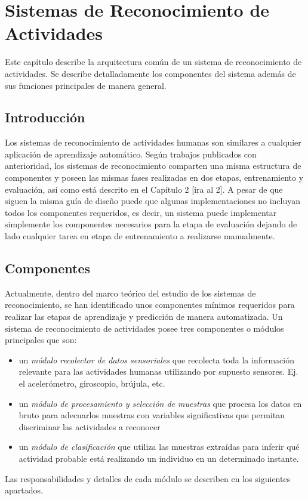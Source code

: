 
\chapter{Sistemas de Reconocimiento de Actividades }

\label{chap:sistemas-de-reconocimiento}

Este capítulo describe la arquitectura común de un sistema de reconocimiento
de actividades. Se describe detalladamente los componentes del sistema
además de sus funciones principales de manera general. 

\section{Introducción}

Los sistemas de reconocimiento de actividades humanas son similares
a cualquier aplicación de aprendizaje automático. Según trabajos publicados
con anterioridad\cite{LaraLabrador2013}, los sistemas de reconocimiento
comparten una misma estructura de componentes y poseen las mismas
fases realizadas en dos etapas, entrenamiento y evaluación, así como
está descrito en el Capítulo 2 {[}ira al 2{]}. A pesar de que siguen
la misma guía de diseño puede que algunas implementaciones no incluyan
todos los componentes requeridos, es decir, un sistema puede implementar
simplemente los componentes necesarios para la etapa de evaluación
dejando de lado cualquier tarea en etapa de entrenamiento a realizarse
manualmente. 

\section{Componentes}

Actualmente, dentro del marco teórico del estudio de los sistemas
de reconocimiento, se han identificado unos componentes mínimos requeridos
para realizar las etapas de aprendizaje y predicción de manera automatizada\cite{choudhury2008mobile}.
Un sistema de reconocimiento de actividades posee tres componentes
o módulos principales que son:
\begin{itemize}
\item un \emph{módulo recolector de datos sensoriales} que recolecta toda
la información relevante para las actividades humanas utilizando por
supuesto sensores. Ej. el acelerómetro, giroscopio, brújula, etc.
\item un \emph{módulo de procesamiento y selección de muestras} que procesa
los datos en bruto para adecuarlos muestras con variables significativas
que permitan discriminar las actividades a reconocer
\item un \emph{módulo de clasificación }que utiliza las muestras extraídas
para inferir qué actividad probable está realizando un individuo en
un determinado instante.
\end{itemize}
Las responsabilidades y detalles de cada módulo se describen en los
siguientes apartados.

